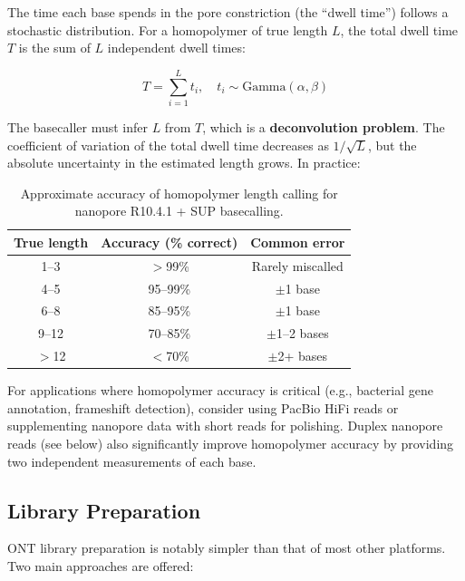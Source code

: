The time each base spends in the pore constriction (the ``dwell time'') follows a stochastic distribution. For a homopolymer of true length $L$, the total dwell time $T$ is the sum of $L$ independent dwell times:

\begin{equation}
T = \sum_{i=1}^{L} t_i, \quad t_i \sim \text{Gamma}(\alpha, \beta)
\label{eq:longread:dwell-sum}
\end{equation}

The basecaller must infer $L$ from $T$, which is a \textbf{deconvolution problem}. The coefficient of variation of the total dwell time decreases as $1/\sqrt{L}$, but the absolute uncertainty in the estimated length grows. In practice:

\begin{table}[htbp]
\centering
\caption[Homopolymer length accuracy.]{Approximate accuracy of homopolymer length calling for nanopore R10.4.1 + SUP basecalling.}
\label{tab:longread:homopolymer-accuracy}
\small
\begin{tabular}{ccc}
\toprule
\textbf{True length} & \textbf{Accuracy (\% correct)} & \textbf{Common error} \\
\midrule
1--3 & $>$99\% & Rarely miscalled \\
4--5 & 95--99\% & $\pm$1 base \\
6--8 & 85--95\% & $\pm$1 base \\
9--12 & 70--85\% & $\pm$1--2 bases \\
$>$12 & $<$70\% & $\pm$2+ bases \\
\bottomrule
\end{tabular}
\end{table}

\begin{tipbox}
For applications where homopolymer accuracy is critical (e.g., bacterial gene annotation, frameshift detection), consider using PacBio HiFi reads or supplementing nanopore data with short reads for polishing. Duplex nanopore reads (see below) also significantly improve homopolymer accuracy by providing two independent measurements of each base.
\end{tipbox}


\subsection{Library Preparation}

ONT library preparation is notably simpler than that of most other platforms. Two main approaches are offered:

